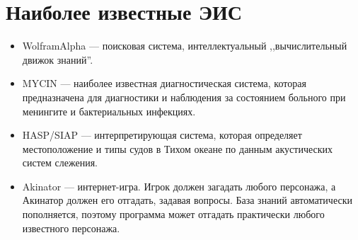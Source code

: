 \documentclass[a4paper,12pt,notitlepage,pdftex,headsepline]{scrartcl}
\begin{document}
\section{Наиболее известные ЭИС}
  \begin{itemize}
    \item WolframAlpha --- поисковая система, интеллектуальный
      ,,вычислительный движок знаний''.
    \item MYCIN --- наиболее известная диагностическая система, которая
      предназначена для диагностики и наблюдения за состоянием больного при
      менингите и бактериальных инфекциях.
    \item HASP/SIAP --- интерпретирующая система, которая определяет
      местоположение и типы судов в Тихом океане по данным акустических систем
      слежения.
    \item Akinator --- интернет-игра.
      Игрок должен загадать любого персонажа, а Акинатор должен его отгадать,
      задавая вопросы.
      База знаний автоматически пополняется, поэтому программа может отгадать
      практически любого известного персонажа.
  \end{itemize}
\end{document}
